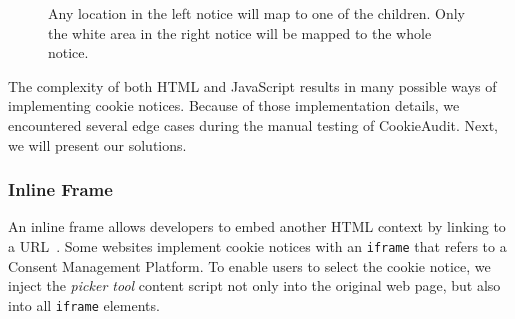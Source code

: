 \begin{figure}
	\centering
	\begin{minipage}{0.48\textwidth}
		\centering
	\end{minipage}\hfill
	\begin{minipage}{0.48\textwidth}
		\centering
	\end{minipage}
	\caption{Any location in the left notice will map to one of the children. Only the white area in the right notice will be mapped to the whole notice.}
	\label{fig:notice-fillout}
\end{figure}

The complexity of both HTML and JavaScript results in many possible ways of implementing cookie notices.
Because of those implementation details, we encountered several edge cases during the manual testing of CookieAudit.
Next, we will present our solutions.

\subsubsection{Inline Frame}
An inline frame allows developers to embed another HTML context by linking to a URL~\cite{iframeMdn}.
Some websites implement cookie notices with an \texttt{iframe} that refers to a Consent Management Platform.
To enable users to select the cookie notice, we inject the \emph{picker tool} content script not only into the original web page, but also into all \texttt{iframe} elements.

